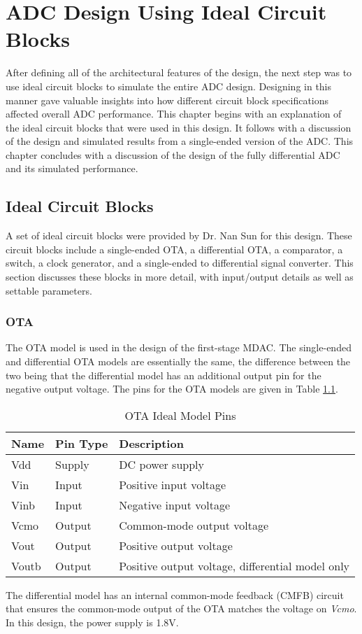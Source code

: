\chapter{ADC Design Using Ideal Circuit Blocks}
After defining all of the architectural features of the design, the next step was to use ideal circuit blocks to simulate the entire ADC design. Designing in this manner gave valuable insights into how different circuit block 
specifications affected overall ADC performance. This chapter begins with an explanation of the ideal circuit blocks that were used in this design. It follows with a discussion of the design and simulated results from a single-ended version of the ADC. This chapter concludes with a discussion of the design of the fully differential ADC and its simulated performance.
\section{Ideal Circuit Blocks}
A set of ideal circuit blocks were provided by Dr. Nan Sun for this design. These circuit blocks include a single-ended OTA, a differential OTA, a comparator, a switch, a clock generator, and a single-ended to differential 
signal converter. This section discusses these blocks in more detail, with input/output details as well as settable parameters.
\subsection{OTA}
The OTA model is used in the design of the first-stage MDAC. The single-ended and differential OTA models are essentially the same, the difference between the two being that the differential model has an additional output pin for the negative output voltage. The pins for the OTA models are given in Table \ref{tab:otapins}.
\begin{table}[htbp]
\begin{center}
\begin{tabular}{|l|l|l|}
\hline
Name & Pin Type & Description \\ \hline
Vdd & Supply & DC power supply \\ \hline
Vin & Input & Positive input voltage \\ \hline
Vinb & Input & Negative input voltage \\ \hline
Vcmo & Output & Common-mode output voltage \\ \hline
Vout & Output & Positive output voltage \\ \hline
Voutb & Output & Positive output voltage, differential model only \\ \hline
\end{tabular}
\end{center}
\caption{OTA Ideal Model Pins}
\label{tab:otapins}
\end{table}
The differential model has an internal common-mode feedback (CMFB) circuit that ensures the common-mode output of the OTA matches the voltage on \emph{Vcmo}. In this design, the power supply is 1.8V. 

